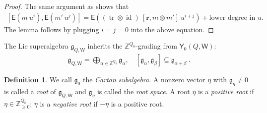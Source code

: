 \documentclass[10pt]{amsart}
\theoremstyle{definition}
\newtheorem{Definition}[Theorem]{Definition}
\numberwithin{equation}{section}
\newcommand{\bZ}{\mathbb{Z}}
\newcommand{\sW}{\mathsf{W}}
\newcommand{\tr}{\operatorname{tr}}
\newcommand{\id}{\operatorname{id}}
\begin{document}
\begin{proof}
The same argument as \cite[Prop.~5.2.1]{MO} shows that
\begin{align}\label{commutator}
    [\mathsf E(m\:u^{i}),\mathsf E(m'\:u^{j})]=\mathsf E\left((\tr\otimes\id)\:[\pmb r,m\otimes m']\: u^{i+j}\right)+\text{lower degree in }u.
\end{align}
The lemma follows by plugging $i=j=0$ into the above equation.
\end{proof}

The Lie superalgebra 
 $\mathfrak{g}_{Q,\sW}$ inherits the $\bZ^{Q_0}$-grading from $\mathsf Y_0(Q,\sW)$:
\begin{align*}
    \mathfrak{g}_{Q,\sW}=\bigoplus_{\alpha\in \bZ^{Q_0}} \mathfrak{g}_{\alpha},\quad [\mathfrak{g}_{\alpha},\mathfrak{g}_{\beta}]\subseteq \mathfrak{g}_{\alpha+\beta}\:.
\end{align*}

\begin{Definition}\label{def of cartan sub}
We call $\mathfrak{g}_0$ the \emph{Cartan subalgebra}. A nonzero vector $\eta$ with $\mathfrak{g}_\eta\neq 0$ is called a \emph{root} of $\mathfrak{g}_{Q,\sW}$ and $\mathfrak{g}_\eta$ is called the \emph{root space}. A root $\eta$ is a \emph{positive root} if $\eta\in \bZ_{\geqslant 0}^{Q_0}$; $\eta$ is a \emph{negative root} if $-\eta$ is a positive root. 
\end{Definition}
\end{document}
